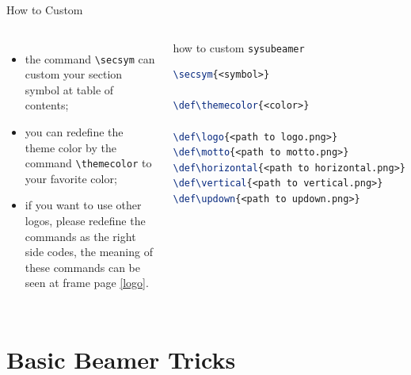 \documentclass{beamer}
\begin{document}
\begin{frame}[fragile]{How to Custom}
\begin{columns}
    \begin{itemize}
        \item the command \texttt{\textbackslash secsym} can custom your section symbol at table of contents;
        \item you can redefine the theme color by the command \texttt{\textbackslash themecolor} to your favorite color;
        \item if you want to use other logos, please redefine the commands as the right side codes, the meaning of these commands can be seen at frame page \ref{logo}.
    \end{itemize}
    \begin{block}{how to custom \texttt{sysubeamer}}
\begin{lstlisting}[language=TeX]
% wirte it at document preamble
\secsym{<symbol>}

\def\themecolor{<color>}

\def\logo{<path to logo.png>}
\def\motto{<path to motto.png>}
\def\horizontal{<path to horizontal.png>}
\def\vertical{<path to vertical.png>}
\def\updown{<path to updown.png>}
\end{lstlisting}
    \end{block}
\end{columns}
\end{frame}

\section{Basic Beamer Tricks}
\end{document}
